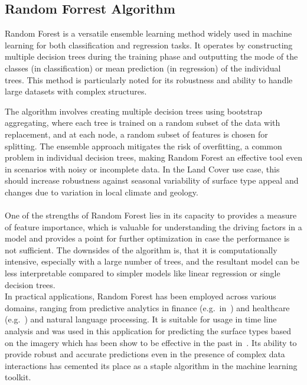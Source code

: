 \documentclass[12pt,a4paper, english,twoside]{article}
\begin{document}
  \subsection{Random Forrest Algorithm}\label{sec:randomForrest}
    Random Forest is a versatile ensemble learning method widely used in machine learning for both classification and regression tasks.
    It operates by constructing multiple decision trees during the training phase and outputting the mode of the classes (in classification) or mean prediction (in regression) of the individual trees.
    This method is particularly noted for its robustness and ability to handle large datasets with complex structures.
    
    The algorithm involves creating multiple decision trees using bootstrap aggregating, where each tree is trained on a random subset of the data with replacement, and at each node, a random subset of features is chosen for splitting.
    The ensemble approach mitigates the risk of overfitting, a common problem in individual decision trees, making Random Forest an effective tool even in scenarios with noisy or incomplete data. 
    In the Land Cover use case, this should increase robustness against seasonal variability of surface type appeal and changes due to variation in local climate and geology.\\ \\
    
    One of the strengths of Random Forest lies in its capacity to provides a measure of feature importance, which is valuable for understanding the driving factors in a model and provides a point for further optimization in case the performance is not sufficient.
    The downsides of the algorithm is, that it is computationally intensive, especially with a large number of trees, and the resultant model can be less interpretable compared to simpler models like linear regression or single decision trees.\\
    
    In practical applications, Random Forest has been employed across various domains, ranging from predictive analytics in finance (e.g.\ in~\cite{Zhang2022}) and healthcare (e.g.~\cite{Kane2014}) and natural language processing. 
    It is suitable for usage in time line analysis and was used in this application for predicting the surface types based on the imagery which has been show to be effective in the past in~\cite{Piao2021}.
    Its ability to provide robust and accurate predictions even in the presence of complex data interactions has cemented its place as a staple algorithm in the machine learning toolkit.
    
\end{document}
